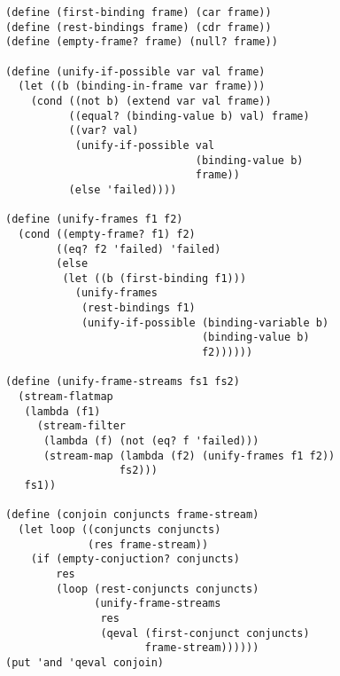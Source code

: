 \documentclass[a4paper,12pt]{article}
\begin{document}
\begin{lstlisting}
(define (first-binding frame) (car frame))
(define (rest-bindings frame) (cdr frame))
(define (empty-frame? frame) (null? frame))

(define (unify-if-possible var val frame)
  (let ((b (binding-in-frame var frame)))
    (cond ((not b) (extend var val frame))
          ((equal? (binding-value b) val) frame)
          ((var? val)
           (unify-if-possible val
                              (binding-value b)
                              frame))
          (else 'failed))))

(define (unify-frames f1 f2)
  (cond ((empty-frame? f1) f2)
        ((eq? f2 'failed) 'failed)
        (else
         (let ((b (first-binding f1)))
           (unify-frames
            (rest-bindings f1)
            (unify-if-possible (binding-variable b)
                               (binding-value b)
                               f2))))))

(define (unify-frame-streams fs1 fs2)
  (stream-flatmap
   (lambda (f1)
     (stream-filter
      (lambda (f) (not (eq? f 'failed)))
      (stream-map (lambda (f2) (unify-frames f1 f2))
                  fs2)))
   fs1))

(define (conjoin conjuncts frame-stream)
  (let loop ((conjuncts conjuncts)
             (res frame-stream))
    (if (empty-conjuction? conjuncts)
        res
        (loop (rest-conjuncts conjuncts)
              (unify-frame-streams
               res
               (qeval (first-conjunct conjuncts)
                      frame-stream))))))
(put 'and 'qeval conjoin)
\end{lstlisting}
\end{document}
